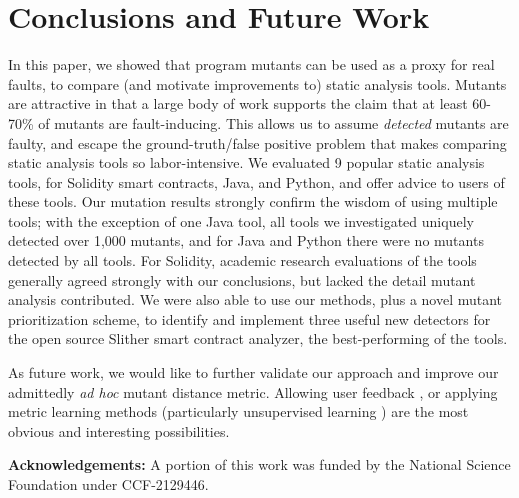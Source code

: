 \section{Conclusions and Future Work}

In this paper, we showed that program mutants can be used as a proxy
for real faults, to compare (and motivate improvements to) static
analysis tools.  Mutants are attractive in that a large body of work supports the
claim that at least 60-70\% of mutants are fault-inducing.   This
allows us to assume \emph{detected} mutants are faulty, and escape the
ground-truth/false positive problem that makes comparing static
analysis tools so labor-intensive.   We
evaluated 9 popular static analysis tools, for Solidity smart contracts, Java,
and Python, and offer advice to users of these tools.  Our mutation
results strongly confirm the wisdom of using multiple tools; with the
exception of one Java tool, all tools we investigated uniquely
detected over 1,000 mutants, and for Java and Python there were no
mutants detected by all tools. For Solidity,
academic research evaluations of the tools generally agreed strongly
with our conclusions, but lacked the detail mutant analysis contributed.
We were also able to use our methods, plus a novel mutant prioritization scheme, to
identify and implement three useful new detectors for the open source Slither smart contract
analyzer, the best-performing of the tools.

As future work, we would like to further validate our approach and
improve our admittedly \emph{ad hoc} mutant distance metric.  Allowing
user feedback \cite{EndUserMistake,OnlyOracle}, or applying metric
learning methods \cite{kulis2012metric} (particularly unsupervised
learning \cite{scholkopf1998nonlinear,tipping1999probabilistic}) are
the most obvious and interesting possibilities.


{\bf Acknowledgements:} A portion of this work was funded by the National Science Foundation under CCF-2129446.
